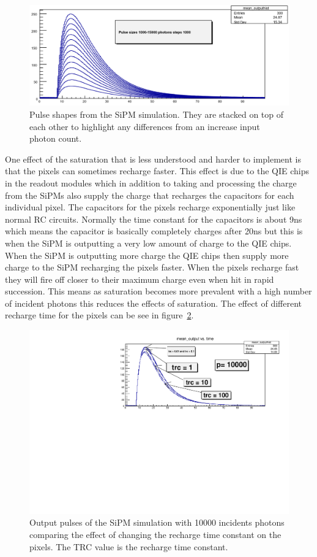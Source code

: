 \begin{figure}
\centering
\includegraphics[width=\linewidth]{Figures/SimPul.png}
\caption{Pulse shapes from the SiPM simulation. They are stacked on top of each other to highlight any differences from an increase input photon count.}
\label{fig:SimPul}
\end{figure}

One effect of the saturation that is less understood and harder to implement is that the pixels can sometimes recharge faster. This effect is due to the QIE chips in the readout modules which in addition to taking and processing the charge from the SiPMs also supply the charge that recharges the capacitors for each individual pixel. The capacitors for the pixels recharge exponentially just like normal RC circuits. Normally the time constant for the capacitors is about 9ns which means the capacitor is basically completely charges after 20ns but this is when the SiPM is outputting a very low amount of charge to the QIE chips. When the SiPM is outputting more charge the QIE chips then supply more charge to the SiPM recharging the pixels faster. When the pixels recharge fast they will fire off closer to their maximum charge even when hit in rapid succession. This means as saturation becomes more prevalent with a high number of incident photons this reduces the effects of saturation. The effect of different recharge time for the pixels can be see in figure~\ref{fig:trc}.

\begin{figure}
\centering
\includegraphics[width=\linewidth]{Figures/p10000trc.pdf}
\caption{Output pulses of the SiPM simulation with 10000 incidents photons comparing the effect of changing the recharge time constant on the pixels. The TRC value is the recharge time constant.}
\label{fig:trc}
\end{figure}

